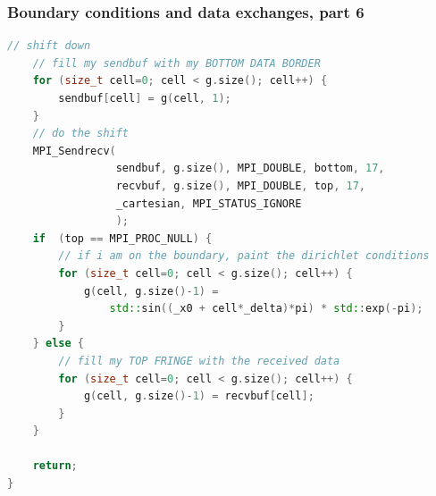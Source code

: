 \begin{frame}[fragile]
%
  \frametitle{Boundary conditions and data exchanges, part 6}
%
  \begin{lstlisting}[language=c++,name=mpi:example-impl]
    // shift down
    // fill my sendbuf with my BOTTOM DATA BORDER
    for (size_t cell=0; cell < g.size(); cell++) {
        sendbuf[cell] = g(cell, 1);
    }
    // do the shift
    MPI_Sendrecv(
                 sendbuf, g.size(), MPI_DOUBLE, bottom, 17,
                 recvbuf, g.size(), MPI_DOUBLE, top, 17,
                 _cartesian, MPI_STATUS_IGNORE
                 );
    if  (top == MPI_PROC_NULL) {
        // if i am on the boundary, paint the dirichlet conditions
        for (size_t cell=0; cell < g.size(); cell++) {
            g(cell, g.size()-1) = 
                std::sin((_x0 + cell*_delta)*pi) * std::exp(-pi);
        }
    } else {
        // fill my TOP FRINGE with the received data
        for (size_t cell=0; cell < g.size(); cell++) {
            g(cell, g.size()-1) = recvbuf[cell];
        }
    }
    
    return;
}
  \end{lstlisting}
% 
\end{frame}

